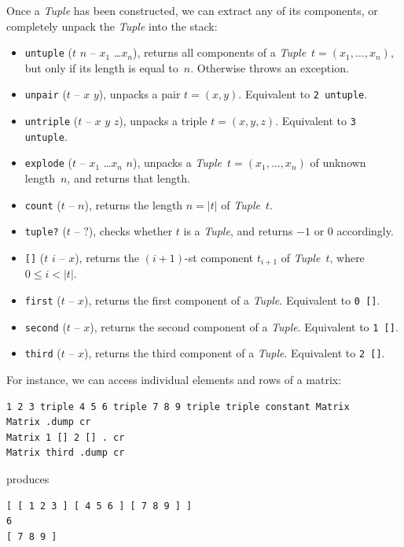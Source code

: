 \documentclass[12pt,oneside]{article}
\begin{document}
Once a {\em Tuple\/} has been constructed, we can extract any of its components, or completely unpack the {\em Tuple\/} into the stack:
\begin{itemize}
\item {\tt untuple} ($t$ $n$ -- $x_1$ \dots $x_n$), returns all components of a {\em Tuple\/}~$t=(x_1,\ldots,x_n)$, but only if its length is equal to~$n$. Otherwise throws an exception.
\item {\tt unpair} ($t$ -- $x$ $y$), unpacks a pair $t=(x,y)$. Equivalent to {\tt 2 untuple}.
\item {\tt untriple} ($t$ -- $x$ $y$ $z$), unpacks a triple $t=(x,y,z)$. Equivalent to {\tt 3 untuple}.
\item {\tt explode} ($t$ -- $x_1$ \dots $x_n$ $n$), unpacks a {\em Tuple\/}~$t=(x_1,\ldots,x_n)$ of unknown length~$n$, and returns that length.
\item {\tt count} ($t$ -- $n$), returns the length $n=|t|$ of {\em Tuple\/}~$t$.
\item {\tt tuple?} ($t$ -- $?$), checks whether $t$ is a {\em Tuple}, and returns $-1$ or $0$ accordingly.
\item {\tt []} ($t$ $i$ -- $x$), returns the $(i+1)$-st component $t_{i+1}$ of {\em Tuple\/}~$t$, where $0\leq i<|t|$.
\item {\tt first} ($t$ -- $x$), returns the first component of a {\em Tuple}. Equivalent to {\tt 0 []}.
\item {\tt second} ($t$ -- $x$), returns the second component of a {\em Tuple}. Equivalent to {\tt 1 []}.
\item {\tt third} ($t$ -- $x$), returns the third component of a {\em Tuple}. Equivalent to {\tt 2 []}.
\end{itemize}
For instance, we can access individual elements and rows of a matrix:
\begin{verbatim}
1 2 3 triple 4 5 6 triple 7 8 9 triple triple constant Matrix
Matrix .dump cr
Matrix 1 [] 2 [] . cr
Matrix third .dump cr
\end{verbatim}
produces
\begin{verbatim}
[ [ 1 2 3 ] [ 4 5 6 ] [ 7 8 9 ] ]
6
[ 7 8 9 ]
\end{verbatim}
\end{document}
